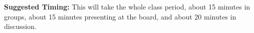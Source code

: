 \documentclass{ximera}
\begin{document}
\begin{instructorNotes}
{\bf Suggested Timing:} This will take the whole class period, about 15 minutes in groups, about 15 minutes presenting at the board, and about 20 minutes in discussion.
\end{instructorNotes}
\end{document}
